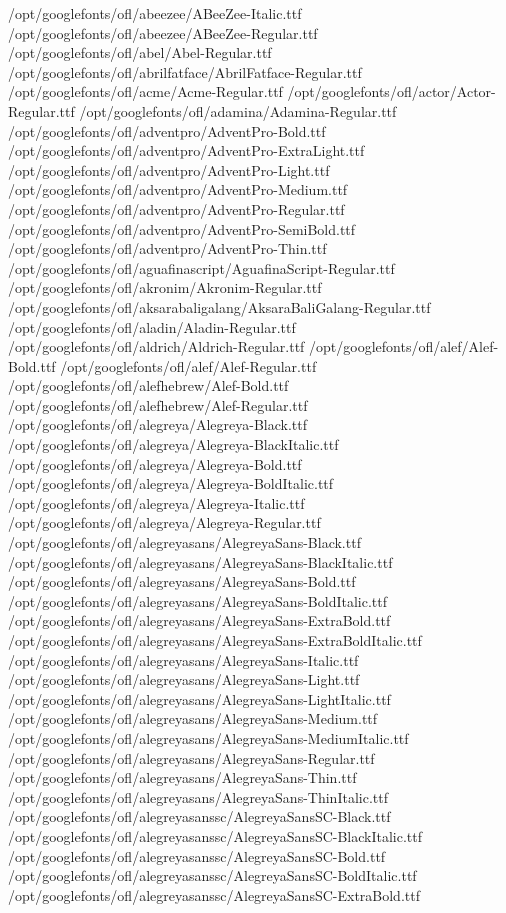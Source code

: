 /opt/googlefonts/ofl/abeezee/ABeeZee-Italic.ttf
/opt/googlefonts/ofl/abeezee/ABeeZee-Regular.ttf
/opt/googlefonts/ofl/abel/Abel-Regular.ttf
/opt/googlefonts/ofl/abrilfatface/AbrilFatface-Regular.ttf
/opt/googlefonts/ofl/acme/Acme-Regular.ttf
/opt/googlefonts/ofl/actor/Actor-Regular.ttf
/opt/googlefonts/ofl/adamina/Adamina-Regular.ttf
/opt/googlefonts/ofl/adventpro/AdventPro-Bold.ttf
/opt/googlefonts/ofl/adventpro/AdventPro-ExtraLight.ttf
/opt/googlefonts/ofl/adventpro/AdventPro-Light.ttf
/opt/googlefonts/ofl/adventpro/AdventPro-Medium.ttf
/opt/googlefonts/ofl/adventpro/AdventPro-Regular.ttf
/opt/googlefonts/ofl/adventpro/AdventPro-SemiBold.ttf
/opt/googlefonts/ofl/adventpro/AdventPro-Thin.ttf
/opt/googlefonts/ofl/aguafinascript/AguafinaScript-Regular.ttf
/opt/googlefonts/ofl/akronim/Akronim-Regular.ttf
/opt/googlefonts/ofl/aksarabaligalang/AksaraBaliGalang-Regular.ttf
/opt/googlefonts/ofl/aladin/Aladin-Regular.ttf
/opt/googlefonts/ofl/aldrich/Aldrich-Regular.ttf
/opt/googlefonts/ofl/alef/Alef-Bold.ttf
/opt/googlefonts/ofl/alef/Alef-Regular.ttf
/opt/googlefonts/ofl/alefhebrew/Alef-Bold.ttf
/opt/googlefonts/ofl/alefhebrew/Alef-Regular.ttf
/opt/googlefonts/ofl/alegreya/Alegreya-Black.ttf
/opt/googlefonts/ofl/alegreya/Alegreya-BlackItalic.ttf
/opt/googlefonts/ofl/alegreya/Alegreya-Bold.ttf
/opt/googlefonts/ofl/alegreya/Alegreya-BoldItalic.ttf
/opt/googlefonts/ofl/alegreya/Alegreya-Italic.ttf
/opt/googlefonts/ofl/alegreya/Alegreya-Regular.ttf
/opt/googlefonts/ofl/alegreyasans/AlegreyaSans-Black.ttf
/opt/googlefonts/ofl/alegreyasans/AlegreyaSans-BlackItalic.ttf
/opt/googlefonts/ofl/alegreyasans/AlegreyaSans-Bold.ttf
/opt/googlefonts/ofl/alegreyasans/AlegreyaSans-BoldItalic.ttf
/opt/googlefonts/ofl/alegreyasans/AlegreyaSans-ExtraBold.ttf
/opt/googlefonts/ofl/alegreyasans/AlegreyaSans-ExtraBoldItalic.ttf
/opt/googlefonts/ofl/alegreyasans/AlegreyaSans-Italic.ttf
/opt/googlefonts/ofl/alegreyasans/AlegreyaSans-Light.ttf
/opt/googlefonts/ofl/alegreyasans/AlegreyaSans-LightItalic.ttf
/opt/googlefonts/ofl/alegreyasans/AlegreyaSans-Medium.ttf
/opt/googlefonts/ofl/alegreyasans/AlegreyaSans-MediumItalic.ttf
/opt/googlefonts/ofl/alegreyasans/AlegreyaSans-Regular.ttf
/opt/googlefonts/ofl/alegreyasans/AlegreyaSans-Thin.ttf
/opt/googlefonts/ofl/alegreyasans/AlegreyaSans-ThinItalic.ttf
/opt/googlefonts/ofl/alegreyasanssc/AlegreyaSansSC-Black.ttf
/opt/googlefonts/ofl/alegreyasanssc/AlegreyaSansSC-BlackItalic.ttf
/opt/googlefonts/ofl/alegreyasanssc/AlegreyaSansSC-Bold.ttf
/opt/googlefonts/ofl/alegreyasanssc/AlegreyaSansSC-BoldItalic.ttf
/opt/googlefonts/ofl/alegreyasanssc/AlegreyaSansSC-ExtraBold.ttf
